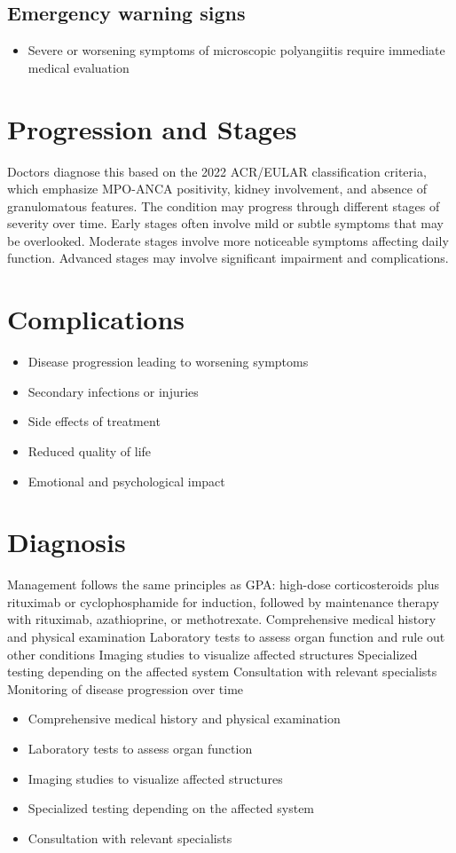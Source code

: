 \subsection{Emergency warning signs}
\begin{itemize}[noitemsep]
  \item Severe or worsening symptoms of microscopic polyangiitis require immediate medical evaluation
\end{itemize}
\section{Progression and Stages}
Doctors diagnose this based on the 2022 ACR/EULAR classification criteria, which emphasize MPO-ANCA positivity, kidney involvement, and absence of granulomatous features. The condition may progress through different stages of severity over time. Early stages often involve mild or subtle symptoms that may be overlooked. Moderate stages involve more noticeable symptoms affecting daily function. Advanced stages may involve significant impairment and complications.
\section{Complications}
\begin{itemize}[noitemsep]
  \item Disease progression leading to worsening symptoms
  \item Secondary infections or injuries
  \item Side effects of treatment
  \item Reduced quality of life
  \item Emotional and psychological impact
\end{itemize}
\section{Diagnosis}
Management follows the same principles as GPA: high-dose corticosteroids plus rituximab or cyclophosphamide for induction, followed by maintenance therapy with rituximab, azathioprine, or methotrexate. Comprehensive medical history and physical examination Laboratory tests to assess organ function and rule out other conditions Imaging studies to visualize affected structures Specialized testing depending on the affected system Consultation with relevant specialists Monitoring of disease progression over time

\begin{itemize}[noitemsep]
  \item Comprehensive medical history and physical examination
  \item Laboratory tests to assess organ function
  \item Imaging studies to visualize affected structures
  \item Specialized testing depending on the affected system
  \item Consultation with relevant specialists
\end{itemize}

